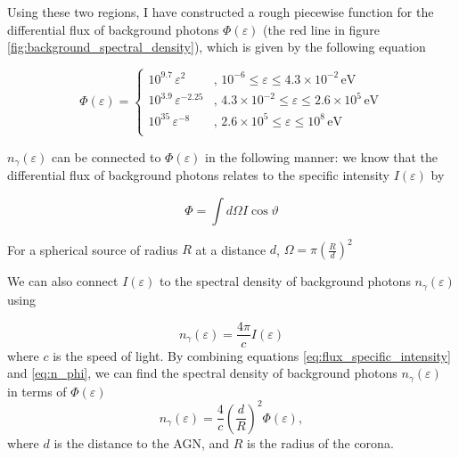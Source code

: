 Using these two regions, I have constructed a rough piecewise function for the differential flux of background photons $\Phi(\varepsilon)$ (the red line in figure \ref{fig:background_spectral_density}), which is given by the following equation

\begin{equation}
    \label{eq:piecewise_phi}
    \Phi(\varepsilon) = \left\{
    \begin{array}{ll}
        10^{9.7}\,\varepsilon^2 & \text{, } 10^{-6} \leq \varepsilon \leq 4.3 \times 10^{-2} \, \text{eV}\\
        10^{3.9}\,\varepsilon^{-2.25} & \text{, } 4.3 \times 10^{-2} \leq \varepsilon \leq 2.6 \times 10^{5} \, \text{eV}\\
        10^{35}\,\varepsilon^{-8} & \text{, } 2.6 \times 10^{5} \leq \varepsilon \leq 10^{8} \, \text{eV}\\
        
    \end{array}
    \right.
\end{equation}

$n_{\gamma}(\varepsilon)$ can be connected to $\Phi(\varepsilon)$ in the following manner: we know that the differential flux of background photons relates to the specific intensity $I(\varepsilon)$ by

\begin{equation}
    \Phi = \int d\Omega I \cos \vartheta
    \label{eq:flux_specific_intensity}
\end{equation}

For a spherical source of radius $R$ at a distance $d$, $\Omega = \pi \left(\frac{R}{d}\right)^2$

We can also connect $I(\varepsilon)$ to the spectral density of background photons $n_{\gamma}(\varepsilon)$ using

\begin{equation}
    n_{\gamma}(\varepsilon) = \frac{4\pi}{c}I(\varepsilon)
    \label{eq:n_phi}
\end{equation} where $c$ is the speed of light. By combining equations \eqref{eq:flux_specific_intensity} and \eqref{eq:n_phi}, we can find the spectral density of background photons $n_{\gamma}(\varepsilon)$ in terms of $\Phi(\varepsilon)$
\begin{equation}
    n_{\gamma}(\varepsilon) = \frac{4}{c}\left(\frac{d}{R}\right)^2\Phi(\varepsilon),
    \label{eq:n_gamma}
\end{equation}
where $d$ is the distance to the AGN, and $R$ is the radius of the corona.

